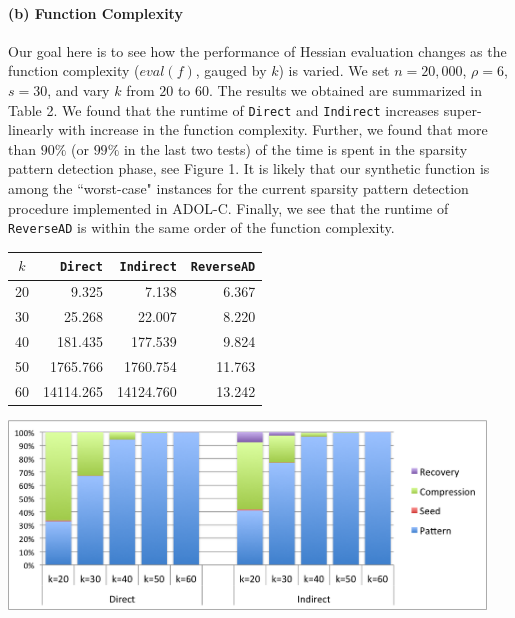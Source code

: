\documentclass[10pt, a4paper, english]{article}
\begin{document}
\paragraph{(b) Function Complexity} 
Our goal here is to see how the performance of Hessian evaluation
changes as the function complexity ($eval(f)$, gauged by $k$) 
is varied. We set $n = 20,000$, $\rho = 6$, $s = 30$, and vary $k$ from $20$ to $60$. 
The results we obtained are summarized in Table 2.
We found that the runtime of {\tt Direct} and {\tt Indirect} increases super-linearly with increase in the function complexity. Further, we found that more than $90\%$ (or $99\%$ in the last two tests) of the time is spent in the sparsity pattern detection phase, see Figure 1. It is likely that our synthetic function is among the ``worst-case" instances for the current sparsity pattern detection procedure implemented in ADOL-C.  Finally, we see that the runtime of {\tt ReverseAD} is within the same order of the function complexity.

\vspace{0.2cm}

\begin{minipage}{\textwidth}
  \begin{minipage}[b]{0.45\textwidth}
    \centering
\begin{tabular}{|c|r|r|r|}
\hline
$k$ & {\tt Direct} & {\tt Indirect} & {\tt ReverseAD} \\
\hline
20 & 9.325 & 7.138 & 6.367 \\
30 & 25.268 & 22.007 & 8.220\\
40 & 181.435 & 177.539 & 9.824\\
50 & 1765.766 & 1760.754 & 11.763 \\
60 & 14114.265 & 14124.760 & 13.242\\
\hline
\end{tabular}
\end{minipage}
\begin{minipage}[b]{0.06\textwidth}
\phantom{b}
\end{minipage}
  \begin{minipage}[b]{0.45\textwidth}
    \centering
    \includegraphics[width=0.95\textwidth]{figures/pb}
  \end{minipage}
  \hfill
\end{minipage}
\end{document}
